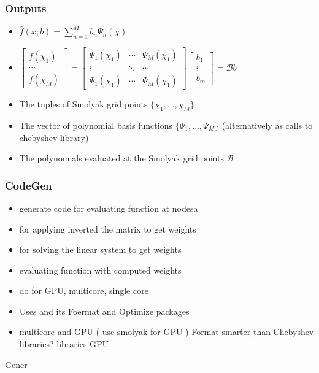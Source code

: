 \documentclass{beamer}
\begin{document}
\begin{frame}
  \frametitle{Outputs}
  \begin{itemize}
  \item $\hat{f}(x;b)=\sum_{n=1}^M b_n \Psi_n(\chi)$
  \item $
    \begin{bmatrix}
      f(\chi_1)\\ \cdots \\       f(\chi_M)
    \end{bmatrix}=
      \begin{bmatrix}
        \Psi_1(\chi_1) &\cdots &        \Psi_M(\chi_1)\\
\vdots&\ddots&\cdots\\
        \Psi_1(\chi_1)& \cdots   &      \Psi_M(\chi_1)
      \end{bmatrix}
      \begin{bmatrix}
        b_1\\ \vdots \\ b_m
      \end{bmatrix}= \mathcal{B} b
$
  \item The tuples of Smolyak grid points $\{\chi_1, \ldots , \chi_M\}$
  \item The vector of polynomial basis functions $\{\Psi_1, \ldots , \Psi_M\}$ (alternatively as calls to chebyshev library)
  \item The polynomials evaluated at the Smolyak grid points $\mathcal{B}$
  \end{itemize}
\end{frame}
\begin{frame}
  \frametitle{CodeGen}
  \begin{itemize}
  \item generate code for evaluating function at nodesa
  \item for applying inverted the matrix to get weights 
  \item for solving the linear system to get weights
  \item evaluating function with computed weights
  \item do for GPU, multicore, single core
  \item Uses \mma  and  its Foermat and Optimize packages
\item multicore and GPU ( use smolyak for GPU ) Format smarter than Chebyshev libraries?  libraries GPU
  \end{itemize}
  Gener
\end{frame}
\end{document}
